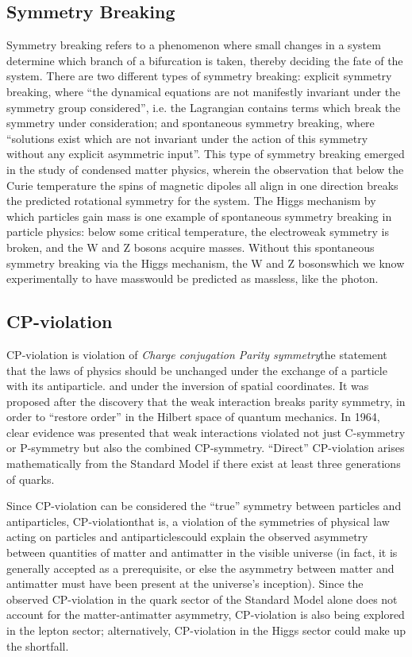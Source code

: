 \subsection{Symmetry Breaking}
Symmetry breaking refers to a phenomenon where small changes in a system determine which branch of a bifurcation is taken, thereby deciding the fate of the system. There are two different types of symmetry breaking: explicit symmetry breaking, where ``the dynamical equations are not manifestly invariant under the symmetry group considered''\cite{Brading:2013:Symmetry}, i.e. the Lagrangian contains terms which break the symmetry under consideration; and spontaneous symmetry breaking, where “solutions exist which are not invariant under the action of this symmetry without any explicit asymmetric input”. This type of symmetry breaking emerged in the study of condensed matter physics, wherein the observation that below the Curie temperature the spins of magnetic dipoles all align in one direction breaks the predicted rotational symmetry for the system\cite{Brading:2013:Symmetry}. The Higgs mechanism by which particles gain mass is one example of spontaneous symmetry breaking in particle physics: below some critical temperature, the electroweak symmetry is broken, and the W and Z bosons acquire masses. Without this spontaneous symmetry breaking via the Higgs mechanism, the W and Z bosons\textemdash which we know experimentally to have mass\textemdash would be predicted as massless, like the photon.\cite{Fermi:Electroweak}

\subsection{CP-violation}
CP-violation is violation of \emph{Charge conjugation Parity symmetry}\textemdash the statement that the laws of physics should be unchanged under the exchange of a particle with its antiparticle. and under the inversion of spatial coordinates. It was proposed after the discovery that the weak interaction breaks parity symmetry, in order to ``restore order'' in the Hilbert space of quantum mechanics. In 1964, clear evidence was presented that weak interactions violated not just C-symmetry or P-symmetry but also the combined CP-symmetry\cite{CroninFitch:CP}. ``Direct'' CP-violation arises mathematically from the Standard Model if there exist at least three generations of quarks.

Since CP-violation can be considered the ``true'' symmetry between particles and antiparticles, CP-violation\textemdash that is, a violation of the symmetries of physical law acting on particles and antiparticles\textemdash could explain the observed asymmetry between quantities of matter and antimatter in the visible universe (in fact, it is generally accepted as a prerequisite, or else the asymmetry between matter and antimatter must have been present at the universe's inception). Since the observed CP-violation in the quark sector of the Standard Model alone does not account for the matter-antimatter asymmetry, CP-violation is also being explored in the lepton sector; alternatively, CP-violation in the Higgs sector could make up the shortfall\cite{LHC:CP:Higgs}.

